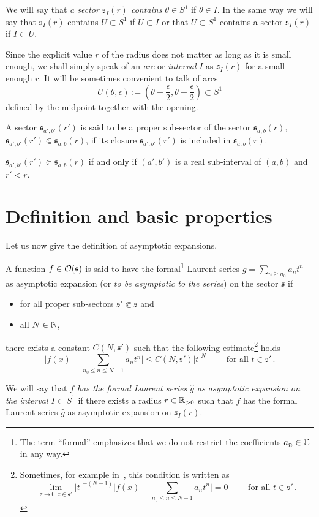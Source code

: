 We will say that \emph{a sector $\mathfrak{s}_{I}(r)$ contains $\theta\in S^1$}
if $\theta\in I$. In the same way we will say that $\mathfrak{s}_I(r)$ contains
$U\subset S^1$ if $U\subset I$ or that $U\subset S^1$ contains a sector
$\mathfrak{s}_I(r)$ if $I\subset U$.
\begin{rem}\label{rem:arcsByWidthAndCenter}
  Since the explicit value $r$ of the radius does not matter as long as it is
  small enough, we shall simply speak of an \emph{arc} or \emph{interval} $I$
  as $\mathfrak{s}_I(r)$ for a small enough $r$.
  It will be sometimes convenient to talk of arcs
  \[
    U(\theta,\epsilon):=\left(\theta-\frac{\epsilon}{2}
    ,\theta+\frac{\epsilon}{2}\right)\subset S^1
  \]
  defined by the midpoint together with the opening.
\end{rem}
\begin{defn}
  A sector $\mathfrak{s}_{a',b'}(r')$ is said to be a proper sub-sector of the
  sector $\mathfrak{s}_{a,b}(r)$,
  $\mathfrak{s}_{a',b'}(r')\Subset\mathfrak{s}_{a,b}(r)$, if its closure
  $\bar{\mathfrak{s}}_{a',b'}(r')$ is included in $\mathfrak{s}_{a,b}(r)$.
  \begin{s-rem}
    $\mathfrak{s}_{a',b'}(r')\Subset\mathfrak{s}_{a,b}(r)$ if and only if
    $(a',b')$ is a real sub-interval of $(a,b)$ and $r'<r$.
  \end{s-rem}
\end{defn}
\section{Definition and basic properties}
Let us now give the definition of asymptotic expansions.
\begin{defn}
  A function $f\in\mathcal{O}(\mathfrak{s})$ is said to have the
  formal\footnote{The term ``formal'' emphasizes that we do not restrict the
  coefficients $a_n\in\mathbb{C}$ in any way.} Laurent series
  $\hat g=\sum_{n\geq n_0}a_nt^n$ as asymptotic expansion (or \emph{to be
  asymptotic to the series}) on the sector $\mathfrak{s}$ if
  \begin{itemize}
    \item for all proper sub-sectors $\mathfrak{s}'\Subset\mathfrak{s}$ and
    \item all $N\in\mathbb{N}$,
  \end{itemize}
  there exists a constant $C(N,\mathfrak{s}')$ such that the following
  estimate\footnote{Sometimes, for example in~\cite{sabbah_cimpa90}, this
    condition is written as
    \[
      \lim_{z\to0,z\in{\mathfrak{s}'}}
      |t|^{-(N-1)}
      \bigl|
        f(x)-\sum_{n_0\leq n\leq N-1}a_nt^n
      \bigr|=0
      \qquad \text{ for all } t\in \mathfrak{s}' \,.
    \]} holds
  \[
    \bigl|
      f(x)-\sum_{n_0\leq n\leq N-1}a_nt^n
    \bigr|
    \leq C(N,\mathfrak{s}')|t|^{N} \qquad \text{ for all }t\in \mathfrak{s}' \,.
  \]
\end{defn}
We will say that \emph{$f$ has the formal Laurent series $\hat g$ as asymptotic
  expansion on the interval $I\subset S^1$} if there exists a radius
$r\in\mathbb{R}_{>0}$ such that $f$ has the formal Laurent series $\hat g$ as asymptotic
expansion on $\mathfrak{s}_I(r)$.

